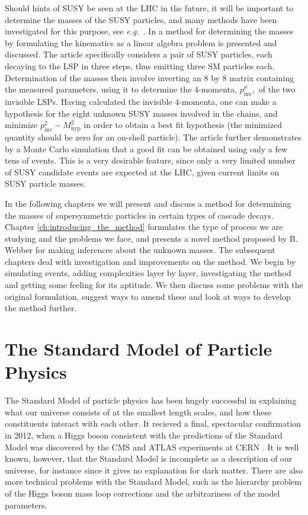 \documentclass[twoside,english]{uiofysmaster}
\begin{document}
Should hints of SUSY be seen at the LHC in the future, it will be important to determine the masses of the SUSY particles, and many methods have been investigated for this purpose, see {\it e.g.}~\cite{Miller:2005zp}. In \cite{Webber:2009vm} a method for determining the masses by formulating the kinematics as a linear algebra problem is presented and discussed. The article specifically considers a pair of SUSY particles, each decaying to the LSP in three steps, thus emitting three SM particles each. Determination of the masses then involve inverting an 8 by 8 matrix containing the measured parameters, using it to determine the 4-momenta, $p^\mu_\mathrm{inv},$ of the two invisible LSPs. Having calculated the invisible 4-momenta, one can make a hypothesis for the eight unknown SUSY masses involved in the chains, and minimize $p^2_\mathrm{inv}-M^2_\mathrm{hyp}$ in order to obtain a best fit hypothesis (the minimized quantity should be zero for an on-shell particle). The article further demonstrates by a Monte 
Carlo simulation that a good fit can be obtained using only a few tens of events. This is a very desirable feature, since only a very limited number of SUSY candidate events are  expected at the LHC, given current limits on SUSY particle masses.

In the following chapters we will present and discuss a method for determining the masses of supersymmetric particles in certain types of cascade decays. Chapter \ref{ch:introducing_the_method} formulates the type of process we are studying and the problems we face, and presents a novel method proposed by B. Webber \cite{Webber:2009vm} for making inferences about the unknown masses. The subsequent chapters deal with investigation and improvements on the method. We begin by simulating events, adding complexities layer by layer, investigating the method and getting some feeling for its aptitude. We then discuss some problems with the original formulation, suggest ways to amend these and look at ways to develop the method further.


% 
\chapter{The Standard Model of Particle Physics}%
\label{ch:SM_intro}
The Standard Model of particle physics has been hugely successful in explaining what our universe consists of at the smallest length scales, and how these constituents interact with each other. It recieved a final, spectacular confirmation in 2012, when a Higgs boson consistent with the predictions of the Standard Model was discovered by the CMS and ATLAS experiments at CERN \cite{Aad:2012tfa, Chatrchyan:2012ufa}. It is well known, however, that the Standard Model is incomplete as a description of our universe, for instance since it gives no explanation for dark matter. There are also more technical problems with the Standard Model, such as the hierarchy problem of the Higgs boson mass loop corrections and the arbitrariness of the model parameters.
\end{document}
